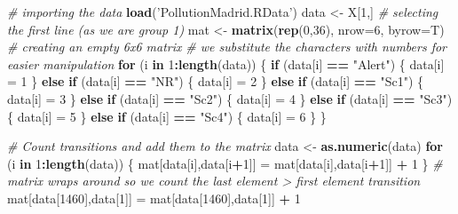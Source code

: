 \documentclass[]{article}
\newenvironment{Shaded}{\begin{snugshade}}{\end{snugshade}}
\newcommand{\CommentTok}[1]{\textcolor[rgb]{0.56,0.35,0.01}{\textit{#1}}}
\newcommand{\ControlFlowTok}[1]{\textcolor[rgb]{0.13,0.29,0.53}{\textbf{#1}}}
\newcommand{\DataTypeTok}[1]{\textcolor[rgb]{0.13,0.29,0.53}{#1}}
\newcommand{\DecValTok}[1]{\textcolor[rgb]{0.00,0.00,0.81}{#1}}
\newcommand{\KeywordTok}[1]{\textcolor[rgb]{0.13,0.29,0.53}{\textbf{#1}}}
\newcommand{\NormalTok}[1]{#1}
\newcommand{\OperatorTok}[1]{\textcolor[rgb]{0.81,0.36,0.00}{\textbf{#1}}}
\newcommand{\StringTok}[1]{\textcolor[rgb]{0.31,0.60,0.02}{#1}}
\begin{document}
\begin{Shaded}
\begin{Highlighting}[]
\CommentTok{# importing the data}
\KeywordTok{load}\NormalTok{(}\StringTok{'PollutionMadrid.RData'}\NormalTok{)}
\NormalTok{data <-}\StringTok{  }\NormalTok{X[}\DecValTok{1}\NormalTok{,] }\CommentTok{# selecting the first line (as we are group 1)}
\NormalTok{mat <-}\StringTok{ }\KeywordTok{matrix}\NormalTok{(}\KeywordTok{rep}\NormalTok{(}\DecValTok{0}\NormalTok{,}\DecValTok{36}\NormalTok{), }\DataTypeTok{nrow=}\DecValTok{6}\NormalTok{, }\DataTypeTok{byrow=}\NormalTok{T) }\CommentTok{# creating an empty 6x6 matrix}
\CommentTok{# we substitute the characters with numbers for easier manipulation}
\ControlFlowTok{for}\NormalTok{ (i }\ControlFlowTok{in} \DecValTok{1}\OperatorTok{:}\KeywordTok{length}\NormalTok{(data)) \{}
  \ControlFlowTok{if}\NormalTok{ (data[i] }\OperatorTok{==}\StringTok{ "Alert"}\NormalTok{) \{}
\NormalTok{    data[i] =}\StringTok{ }\DecValTok{1}
\NormalTok{  \} }\ControlFlowTok{else} \ControlFlowTok{if}\NormalTok{ (data[i] }\OperatorTok{==}\StringTok{ "NR"}\NormalTok{) \{}
\NormalTok{    data[i] =}\StringTok{ }\DecValTok{2}
\NormalTok{  \} }\ControlFlowTok{else} \ControlFlowTok{if}\NormalTok{ (data[i] }\OperatorTok{==}\StringTok{ "Sc1"}\NormalTok{) \{}
\NormalTok{    data[i] =}\StringTok{ }\DecValTok{3}
\NormalTok{  \} }\ControlFlowTok{else} \ControlFlowTok{if}\NormalTok{ (data[i] }\OperatorTok{==}\StringTok{ "Sc2"}\NormalTok{) \{}
\NormalTok{    data[i] =}\StringTok{ }\DecValTok{4} 
\NormalTok{  \} }\ControlFlowTok{else} \ControlFlowTok{if}\NormalTok{ (data[i] }\OperatorTok{==}\StringTok{ "Sc3"}\NormalTok{) \{}
\NormalTok{    data[i] =}\StringTok{ }\DecValTok{5}
\NormalTok{  \} }\ControlFlowTok{else} \ControlFlowTok{if}\NormalTok{ (data[i] }\OperatorTok{==}\StringTok{ "Sc4"}\NormalTok{) \{}
\NormalTok{    data[i] =}\StringTok{ }\DecValTok{6}
\NormalTok{  \}}
\NormalTok{\}}

\CommentTok{# Count transitions and add them to the matrix}
\NormalTok{data <-}\StringTok{ }\KeywordTok{as.numeric}\NormalTok{(data)}
\ControlFlowTok{for}\NormalTok{ (i }\ControlFlowTok{in} \DecValTok{1}\OperatorTok{:}\KeywordTok{length}\NormalTok{(data)) \{}
\NormalTok{  mat[data[i],data[i}\OperatorTok{+}\DecValTok{1}\NormalTok{]] =}\StringTok{ }\NormalTok{mat[data[i],data[i}\OperatorTok{+}\DecValTok{1}\NormalTok{]] }\OperatorTok{+}\StringTok{ }\DecValTok{1}
\NormalTok{\}}
\CommentTok{# matrix wraps around so we count the last element > first element transition}
\NormalTok{mat[data[}\DecValTok{1460}\NormalTok{],data[}\DecValTok{1}\NormalTok{]] =}\StringTok{ }\NormalTok{mat[data[}\DecValTok{1460}\NormalTok{],data[}\DecValTok{1}\NormalTok{]] }\OperatorTok{+}\StringTok{ }\DecValTok{1}


\end{Highlighting}
\end{Shaded}
\end{document}
